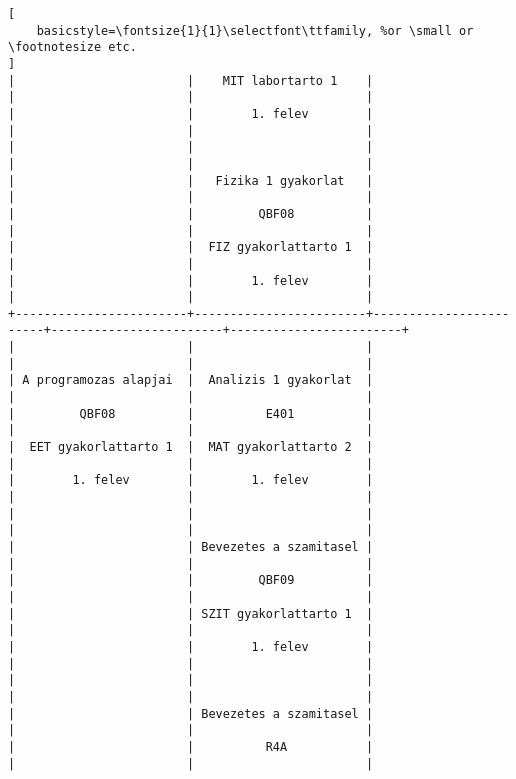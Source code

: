 \begin{lstlisting}[
    basicstyle=\fontsize{1}{1}\selectfont\ttfamily, %or \small or \footnotesize etc.
]
|                        |    MIT labortarto 1    |                        |                        |                        | 
|                        |        1. felev        |                        |                        |                        | 
|                        |                        |                        |                        |                        | 
|                        |   Fizika 1 gyakorlat   |                        |                        |                        | 
|                        |         QBF08          |                        |                        |                        | 
|                        |  FIZ gyakorlattarto 1  |                        |                        |                        | 
|                        |        1. felev        |                        |                        |                        | 
+------------------------+------------------------+------------------------+------------------------+------------------------+
|                        |                        |                        |                        |                        | 
| A programozas alapjai  |  Analizis 1 gyakorlat  |                        |                        |                        | 
|         QBF08          |          E401          |                        |                        |                        | 
|  EET gyakorlattarto 1  |  MAT gyakorlattarto 2  |                        |                        |                        | 
|        1. felev        |        1. felev        |                        |                        |                        | 
|                        |                        |                        |                        |                        | 
|                        | Bevezetes a szamitasel |                        |                        |                        | 
|                        |         QBF09          |                        |                        |                        | 
|                        | SZIT gyakorlattarto 1  |                        |                        |                        | 
|                        |        1. felev        |                        |                        |                        | 
|                        |                        |                        |                        |                        | 
|                        | Bevezetes a szamitasel |                        |                        |                        | 
|                        |          R4A           |                        |                        |                        | 

\end{lstlisting}
